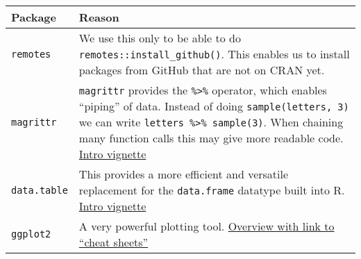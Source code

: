 \documentclass[]{article}
\begin{document}
\begin{longtable}[]{@{}ll@{}}
\toprule
\begin{minipage}[b]{0.13\columnwidth}\raggedright
Package\strut
\end{minipage} & \begin{minipage}[b]{0.81\columnwidth}\raggedright
Reason\strut
\end{minipage}\tabularnewline
\midrule
\endhead
\begin{minipage}[t]{0.13\columnwidth}\raggedright
\texttt{remotes}\strut
\end{minipage} & \begin{minipage}[t]{0.81\columnwidth}\raggedright
We use this only to be able to do \texttt{remotes::install\_github()}.
This enables us to install packages from GitHub that are not on CRAN
yet.\strut
\end{minipage}\tabularnewline
\begin{minipage}[t]{0.13\columnwidth}\raggedright
\texttt{magrittr}\strut
\end{minipage} & \begin{minipage}[t]{0.81\columnwidth}\raggedright
\texttt{magrittr} provides the \texttt{\%\textgreater{}\%} operator,
which enables ``piping'' of data. Instead of doing
\texttt{sample(letters,\ 3)} we can write
\texttt{letters\ \%\textgreater{}\%\ sample(3)}. When chaining many
function calls this may give more readable code.
\href{https://cran.r-project.org/web/packages/magrittr/vignettes/magrittr.html}{Intro
vignette}\strut
\end{minipage}\tabularnewline
\begin{minipage}[t]{0.13\columnwidth}\raggedright
\texttt{data.table}\strut
\end{minipage} & \begin{minipage}[t]{0.81\columnwidth}\raggedright
This provides a more efficient and versatile replacement for the
\texttt{data.frame} datatype built into R.
\href{https://cran.r-project.org/web/packages/data.table/vignettes/datatable-intro.html}{Intro
vignette}\strut
\end{minipage}\tabularnewline
\begin{minipage}[t]{0.13\columnwidth}\raggedright
\texttt{ggplot2}\strut
\end{minipage} & \begin{minipage}[t]{0.81\columnwidth}\raggedright
A very powerful plotting tool.
\href{https://ggplot2.tidyverse.org/}{Overview with link to ``cheat
sheets''}\strut
\end{minipage}\tabularnewline

\end{longtable}
\end{document}
